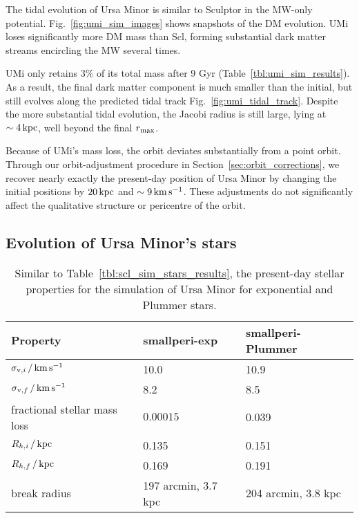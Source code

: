 The tidal evolution of Ursa Minor is similar to Sculptor in the MW-only
potential. Fig.~\ref{fig:umi_sim_images} shows snapshots of the DM
evolution. UMi loses significantly more DM mass than Scl, forming
substantial dark matter streams encircling the MW several times.

UMi only retains 3\% of its total mass after 9 Gyr
(Table~\ref{tbl:umi_sim_results}). As a result, the final dark matter
component is much smaller than the initial, but still evolves along the
predicted tidal track Fig.~\ref{fig:umi_tidal_track}. Despite the more
substantial tidal evolution, the Jacobi radius is still large, lying at
\(\sim 4\,{\rm kpc}\), well beyond the final \(r_{\rm max}\).

Because of UMi's mass loss, the orbit deviates substantially from a
point orbit. Through our orbit-adjustment procedure in
Section~\ref{sec:orbit_corrections}, we recover nearly exactly the
present-day position of Ursa Minor by changing the initial positions by
\(20\,{\rm kpc}\) and \(\sim 9\,{\rm km\,s^{-1}}\). These adjustments do not
significantly affect the qualitative structure or pericentre of the
orbit.

\subsection{Evolution of Ursa Minor's
stars}\label{evolution-of-ursa-minors-stars}

\begin{table*}[t]
\centering
\caption[Simulation results for Ursa Minor’s stars]{Similar to Table \ref{tbl:scl_sim_stars_results}, the present-day stellar properties for the simulation of Ursa Minor for exponential and Plummer stars. }
\label{tbl:umi_sim_stars_results}
\begin{tabular}{lll}
\toprule
Property & smallperi-exp & smallperi-Plummer\\
\midrule
$\sigma_{{\rm v}, i}\,/\,{\rm km\,s^{-1}}$ & 10.0 & 10.9\\
$\sigma_{{\rm v}, f}\,/\,{\rm km\,s^{-1}}$ & 8.2 & 8.5\\
fractional stellar mass loss & $0.00015$ & 0.039\\
$R_{h, i}\,/\,{\rm kpc}$ & 0.135 & 0.151\\
$R_{h, f}\,/\,{\rm kpc}$ & 0.169 & 0.191\\
break radius & 197 arcmin, 3.7 kpc & 204 arcmin, 3.8 kpc\\
\bottomrule
\end{tabular}
\end{table*}

